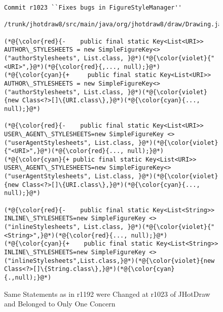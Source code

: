 \begin{figure}[t]
	\centering
	\begin{lstlisting}[]
  Commit r1023 ``Fixes bugs in FigureStyleManager''
  /trunk/jhotdraw8/src/main/java/org/jhotdraw8/draw/Drawing.java
   
(*@{\color{red}{-    public final static Key<List<URI>> AUTHOR\_STYLESHEETS = new SimpleFigureKey<> ("authorStylesheets", List.class, }@*)(*@{\color{violet}{"<URI>",}@*)(*@{\color{red}{,..., null);}@*)
(*@{\color{cyan}{+     public final static Key<List<URI>> AUTHOR\_STYLESHEETS = new SimpleFigureKey<> ("authorStylesheets", List.class, }@*)(*@{\color{violet}{new Class<?>[]\{URI.class\},}@*)(*@{\color{cyan}{..., null);}@*)

(*@{\color{red}{-    public final static Key<List<URI>> USER\_AGENT\_STYLESHEETS=new SimpleFigureKey <>("userAgentStylesheets", List.class, }@*)(*@{\color{violet}{"<URI>",}@*)(*@{\color{red}{..., null);}@*)
(*@{\color{cyan}{+ public final static Key<List<URI>> USER\_AGENT\_STYLESHEETS=new SimpleFigureKey<> ("userAgentStylesheets", List.class, }@*)(*@{\color{violet}{new Class<?>[]\{URI.class\},}@*)(*@{\color{cyan}{..., null);}@*)

(*@{\color{red}{-    public final static Key<List<String>> INLINE\_STYLESHEETS=new SimpleFigureKey <>("inlineStylesheets", List.class, }@*)(*@{\color{violet}{"<String>",}@*)(*@{\color{red}{..., null);}@*)
(*@{\color{cyan}{+    public final static Key<List<String>> INLINE\_STYLESHEETS=new SimpleFigureKey <>("inlineStylesheets",List.class,}@*)(*@{\color{violet}{new Class<?>[]\{String.class\},}@*)(*@{\color{cyan}{.,null);}@*)
	\end{lstlisting}
        \vspace{-15pt}
        \caption{Same Statements as in r1192 were Changed at r1023 of JHotDraw and Belonged to Only One Concern}
        \vspace{-6pt}
        \label{fig:history}
\end{figure}


